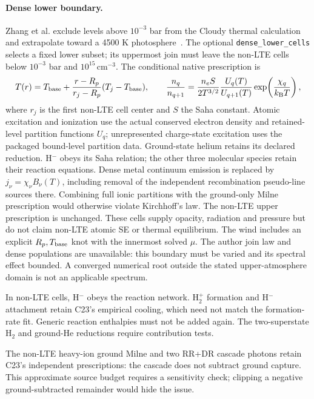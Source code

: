 \documentclass[10pt,a4paper]{article}
\newcommand{\kb}{k_{\mathrm B}}
\begin{document}
\paragraph{Dense lower boundary.}
Zhang et al. exclude levels above $10^{-3}$ bar from the Cloudy thermal
calculation and extrapolate toward a 4500 K photosphere~\cite{zhang}.
The optional \texttt{dense\_lower\_cells} selects a fixed lower subset;
its uppermost join must leave the non-LTE cells below $10^{-3}$ bar and
$10^{15}\,\mathrm{cm}^{-3}$. The conditional native prescription is
\begin{equation}
 T(r)=T_{\rm base}+\frac{r-R_p}{r_j-R_p}(T_j-T_{\rm base}),\qquad
 \frac{n_q}{n_{q+1}}=\frac{n_e S}{2T^{3/2}}
       \frac{U_q(T)}{U_{q+1}(T)}\exp\!\left(\frac{\chi_q}{\kb T}\right),
 \label{eq:lower}
\end{equation}
where $r_j$ is the first non-LTE cell center and $S$ the Saha constant.
Atomic excitation and ionization use the actual conserved electron density
and retained-level partition functions $U_q$; unrepresented charge-state
excitation uses the packaged bound-level partition data. Ground-state helium
retains its declared reduction. H$^-$ obeys its Saha relation; the other
three molecular species retain their reaction equations. Dense metal
continuum emission is replaced by $j_\nu=\chi_\nu B_\nu(T)$, including removal
of the independent recombination pseudo-line sources there. Combining full
ionic partitions with the ground-only Milne prescription would otherwise
violate Kirchhoff's law. The non-LTE upper prescription is unchanged.
These cells supply opacity, radiation and pressure but do not claim
non-LTE atomic SE or thermal equilibrium. The wind includes an explicit
$R_p,T_{\rm base}$ knot with the innermost solved $\mu$.
The author join law and dense populations are unavailable: this boundary
must be varied and its spectral effect bounded. A converged numerical root
outside the stated upper-atmosphere domain is not an applicable spectrum.

In non-LTE cells, H$^-$ obeys the reaction network. H$_2^+$ formation and
H$^-$ attachment retain C23's empirical cooling, which need not match the
formation-rate fit. Generic reaction enthalpies must not be added again.
The two-superstate H$_2$ and ground-He reductions require contribution tests.

The non-LTE heavy-ion ground Milne and two RR+DR cascade photons retain
C23's independent prescriptions: the cascade does not subtract ground
capture. This approximate source budget requires a sensitivity check;
clipping a negative ground-subtracted remainder would hide the issue.
\end{document}
